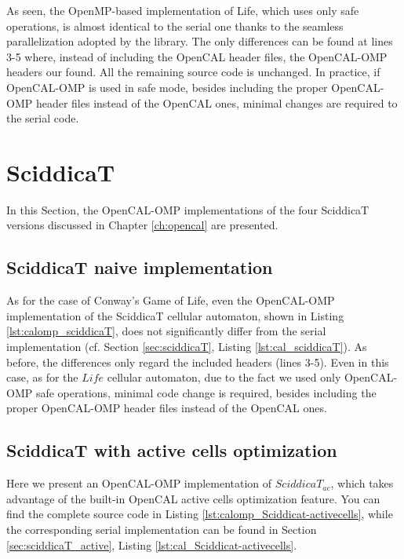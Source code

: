 

As seen, the OpenMP-based implementation of Life, which uses
only safe operations, is almost identical to the serial one thanks to
the seamless parallelization adopted by the library.  The only
differences can be found at lines 3-5 where, instead of including the
OpenCAL header files, the OpenCAL-OMP headers our found. All the
remaining source code is unchanged. In practice, if 
OpenCAL-OMP is used in safe mode, besides including the proper OpenCAL-OMP
header files instead of the OpenCAL ones, minimal changes are required
to the serial code.


\section{SciddicaT}

In this Section, the OpenCAL-OMP implementations of the four SciddicaT
versions discussed in Chapter \ref{ch:opencal} are presented.

\subsection{SciddicaT naive implementation}

As for the case of Conway's Game of Life, even the OpenCAL-OMP
implementation of the SciddicaT cellular automaton, shown in Listing
\ref{lst:calomp_sciddicaT}, does not significantly differ from the
serial implementation (cf. Section \ref{sec:sciddicaT}, Listing
\ref{lst:cal_sciddicaT}). As before, the differences only regard the
included headers (lines 3-5). Even in this case, as for the $Life$
cellular automaton, due to the fact we used only OpenCAL-OMP safe
operations, minimal code change is required, besides including the
proper OpenCAL-OMP header files instead of the OpenCAL ones.



\subsection{SciddicaT with active cells optimization}
Here we present an OpenCAL-OMP implementation of $SciddicaT_{ac}$, which takes
advantage of the built-in OpenCAL active cells optimization feature. You can
find the complete source code in Listing
\ref{lst:calomp_Sciddicat-activecells}, while the corresponding serial
implementation can be found in Section
\ref{sec:sciddicaT_active}, Listing
\ref{lst:cal_Sciddicat-activecells}.

